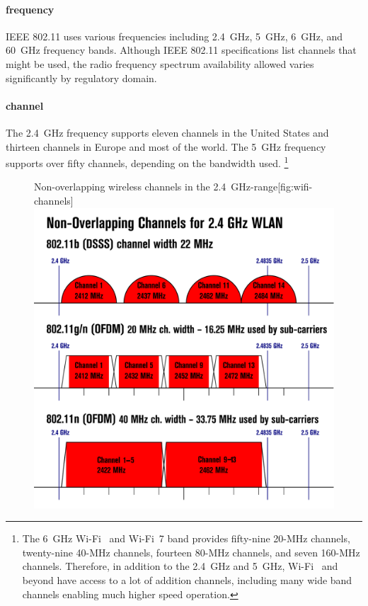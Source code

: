 \paragraph{frequency}
\acs{IEEE} 802.11 uses various frequencies including \SI{2.4}{\giga\hertz}, \SI{5}{\giga\hertz}, \SI{6}{\giga\hertz}, and \SI{60}{\giga\hertz} frequency bands.
Although \acs{IEEE} 802.11 specifications list channels that might be used, the radio frequency spectrum availability allowed varies significantly by regulatory domain.

\paragraph{channel}
The \SI{2.4}{\giga\hertz} frequency supports eleven channels in the United States and thirteen channels in Europe and most of the world.
The \SI{5}{\giga\hertz} frequency supports over fifty channels, depending on the bandwidth used.%
   \footnote{%
   The \SI{6}{\giga\hertz} Wi-Fi~ and Wi-Fi~7 band provides fifty-nine 20-MHz channels, twenty-nine 40-MHz channels, fourteen 80-MHz channels, and seven 160-MHz channels.
   Therefore, in addition to the \SI{2.4}{\giga\hertz} and \SI{5}{\giga\hertz}, Wi-Fi~ and beyond have access to a lot of addition channels, including many wide band channels enabling much higher speed operation.
   }

\begin{figure}
\begin{sidecaption}{Non-overlapping wireless channels in the \SI{2.4}{\giga\hertz}-range}[fig:wifi-channels]
\centering
\includegraphics[width=\textwidth]{images/physical/wifi-channels.png}
\end{sidecaption}
\end{figure}

